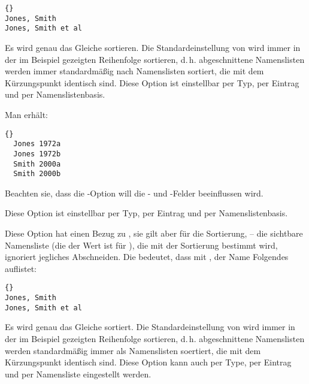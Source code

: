\documentclass{ltxdockit}[2011/03/25]
\begin{document}
\begin{optionlist}
\begin{lstlisting}{}
Jones, Smith
Jones, Smith et al
\end{lstlisting}
%
Es wird genau das Gleiche sortieren. Die Standardeinstellung von 
wird immer in der im Beispiel gezeigten Reihenfolge sortieren, d.\,h. abgeschnittene
Namenslisten werden immer standardmäßig nach Namenslisten sortiert, die mit dem 
Kürzungspunkt identisch sind.
Diese Option ist einstellbar per Typ, per Eintrag und per Namenslistenbasis.

\begin{ltxexample}
\end{ltxexample}
%
Man erhält:

\begin{lstlisting}{}
  Jones 1972a
  Jones 1972b
  Smith 2000a
  Smith 2000b
\end{lstlisting}
%
Beachten sie, dass die -Option will die - und -Felder beeinflussen wird.

Diese Option ist einstellbar per Typ, per Eintrag und per Namenslistenbasis.


Diese Option hat einen Bezug zu , sie gilt aber für die
Sortierung, -- die sichtbare Namensliste (die der Wert ist für ),
die mit der Sortierung bestimmt wird, ignoriert jegliches Abschneiden.
Die bedeutet, dass mit , der Name Folgendes auflistet:

\begin{lstlisting}{}
Jones, Smith
Jones, Smith et al
\end{lstlisting}
%
Es wird genau das Gleiche sortiert. Die Standardeinstellung von 
wird immer in der im Beispiel gezeigten Reihenfolge sortieren, d.\,h. 
abgeschnittene Namenslisten werden standardmäßig immer als Namenslisten soertiert,
die mit dem Kürzungspunkt identisch sind.
Diese Option kann auch 
 per Type, per Eintrag und per Namensliste eingestellt werden.


\end{optionlist}
\end{document}
